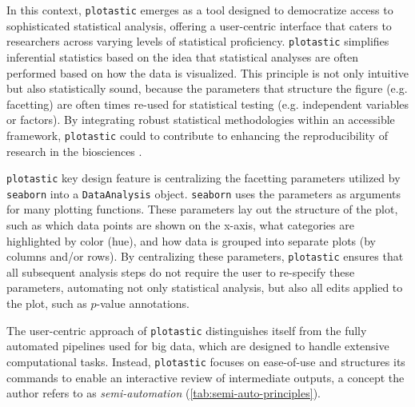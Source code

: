 In this context, \texttt{plotastic} emerges as a tool designed to democratize
access to sophisticated statistical analysis, offering a user-centric interface
that caters to researchers across varying levels of statistical proficiency.
\texttt{plotastic} simplifies inferential statistics based on the idea that
statistical analyses are often performed based on how the data is visualized.
This principle is not only intuitive but also statistically sound,
because the parameters that structure the figure (e.g. facetting) are often
times re-used for statistical testing (e.g. independent variables or factors).
By integrating robust statistical methodologies within an accessible framework,
\texttt{plotastic} could to contribute to enhancing the reproducibility of
research in the biosciences \cite{gomez-cabreroDataIntegrationEra2014}.

\texttt{plotastic} key design feature is centralizing the facetting
parameters utilized by \texttt{seaborn} into a \texttt{DataAnalysis} object.
\texttt{seaborn} uses the parameters \facetparams as arguments for many plotting functions. These
parameters lay out the structure of the plot, such as which data points are
shown on the x-axis, what categories are highlighted by color (hue), and how
data is grouped into separate plots (by columns and/or rows). By centralizing
these parameters, \texttt{plotastic} ensures that all subsequent analysis steps
do not require the user to re-specify these parameters, automating not only
statistical analysis, but also all edits applied to the plot, such as
$p$-value annotations. 

\pagebreak

The user-centric approach of \texttt{plotastic} distinguishes itself from the
fully automated pipelines used for big data, which are designed to handle
extensive computational tasks. Instead, \texttt{plotastic} focuses on
ease-of-use and structures its commands to enable an interactive review of
intermediate outputs, a concept the author refers to as \textit{semi-automation}
(\autoref{tab:semi-auto-principles}).

